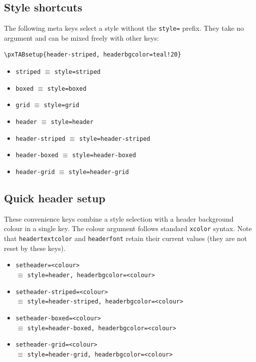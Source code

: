 \documentclass[11pt,a4paper]{article}
\begin{document}
\subsection*{Style shortcuts}

The following meta keys select a style without the \texttt{style=}
prefix.  They take no argument and can be mixed freely with other
keys:

\begin{verbatim}
\pxTABsetup{header-striped, headerbgcolor=teal!20}
\end{verbatim}

\begin{itemize}
  \item \texttt{striped} \quad $\equiv$ \texttt{style=striped}
  \item \texttt{boxed} \quad $\equiv$ \texttt{style=boxed}
  \item \texttt{grid} \quad $\equiv$ \texttt{style=grid}
  \item \texttt{header} \quad $\equiv$ \texttt{style=header}
  \item \texttt{header-striped} \quad $\equiv$ \texttt{style=header-striped}
  \item \texttt{header-boxed} \quad $\equiv$ \texttt{style=header-boxed}
  \item \texttt{header-grid} \quad $\equiv$ \texttt{style=header-grid}
\end{itemize}

\subsection*{Quick header setup}

These convenience keys combine a style selection with a header
background colour in a single key.  The colour argument follows
standard \texttt{xcolor} syntax.  Note that \texttt{headertextcolor}
and \texttt{headerfont} retain their current values (they are not
reset by these keys).

\begin{itemize}
  \item \texttt{setheader=<colour>}\\
    $\equiv$ \texttt{style=header, headerbgcolor=<colour>}
  \item \texttt{setheader-striped=<colour>}\\
    $\equiv$ \texttt{style=header-striped, headerbgcolor=<colour>}
  \item \texttt{setheader-boxed=<colour>}\\
    $\equiv$ \texttt{style=header-boxed, headerbgcolor=<colour>}
  \item \texttt{setheader-grid=<colour>}\\
    $\equiv$ \texttt{style=header-grid, headerbgcolor=<colour>}
\end{itemize}
\end{document}
